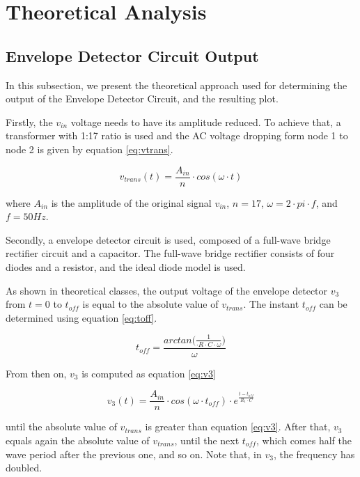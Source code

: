 \section{Theoretical Analysis}
\label{sec:analysis}

\subsection{Envelope Detector Circuit Output}
\label{subsec:theo_edc}

In this subsection, we present the theoretical approach used for determining the output of the Envelope Detector Circuit, and the resulting plot.

Firstly, the $v_{in}$ voltage needs to have its amplitude reduced. To achieve that, a transformer with 1:17 ratio is used and the AC voltage dropping form node 1 to node 2 is given by equation \ref{eq:vtrans}.

\begin{equation}
    v_{trans}(t) = \frac{A_{in}}{n} \cdot cos(\omega \cdot t)
    \label{eq:vtrans}
\end{equation}


where $A_{in}$ is the amplitude of the original signal $v_{in}$, $n=17$, $\omega=2 \cdot pi \cdot f$, and $f=50Hz$.

Secondly, a envelope detector circuit is used, composed of a full-wave bridge rectifier circuit and a capacitor. The full-wave bridge rectifier consists of four diodes and a resistor, and the ideal diode model is used. 

As shown in theoretical classes, the output voltage of the envelope detector $v_3$ from $t=0$ to $t_{off}$ is equal to the absolute value of $v_{trans}$. The instant $t_{off}$ can be determined using equation \ref{eq:toff}.

\begin{equation}
t_{off} = \frac{arctan({\frac{1}{\cdot R \cdot C \cdot \omega})}}{\omega}
\label{eq:toff}
\end{equation}

From then on, $v_3$ is computed as equation \ref{eq:v3}

\begin{equation}
    v_3(t) = \frac{A_{in}}{n} \cdot cos({\omega \cdot t_{off}}) \cdot e^{\frac{t-t_{off}}{R_{1} \cdot C}}
    \label{eq:v3}
\end{equation}

until the absolute value of $v_{trans}$ is greater than equation \ref{eq:v3}. After that, $v_3$ equals again the absolute value of $v_{trans}$, until the next $t_{off}$, which comes half the wave period after the previous one, and so on. Note that, in $v_3$, the frequency has doubled.

